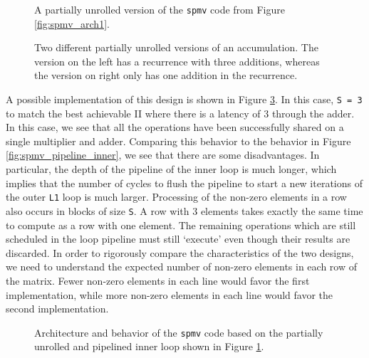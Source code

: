 \begin{figure}

\caption{A partially unrolled version of the \lstinline|spmv| code from Figure \ref{fig:spmv_arch1}.}
\label{fig:spmv_unrolled}
\end{figure}

\begin{figure}
\centering

\caption{Two different partially unrolled versions of an accumulation.  The version on the left has a recurrence with three additions, whereas the version on right only has one addition in the recurrence.}
\label{fig:spmv_partial_unroll}
\end{figure}

A possible implementation of this design is shown in Figure \ref{fig:spmv_unrolled_behavior}.  In this case, \lstinline|S = 3| to match the best achievable II where there is a latency of 3 through the adder.  In this case, we see that all the operations have been successfully shared on a single multiplier and adder.  Comparing this behavior to the behavior in Figure \ref{fig:spmv_pipeline_inner}, we see that there are some disadvantages.  In particular, the depth of the pipeline of the inner loop is much longer, which implies that the number of cycles to flush the pipeline to start a new iterations of the outer \lstinline|L1| loop is much larger.  Processing of the non-zero elements in a row also occurs in blocks of size \lstinline|S|.  A row with 3 elements takes exactly the same time to compute as a row with one element.  The remaining operations which are still scheduled in the loop pipeline must still `execute' even though their results are discarded.  In order to rigorously compare the characteristics of the two designs, we need to understand the expected number of non-zero elements in each row of the matrix.  Fewer non-zero elements in each line would favor the first implementation, while more non-zero elements in each line would favor the second implementation.

\begin{figure}
\centering

\caption{Architecture and behavior of the \lstinline{spmv} code based on the partially unrolled and pipelined inner loop shown in Figure \ref{fig:spmv_unrolled}.}
\label{fig:spmv_unrolled_behavior}
\end{figure}

